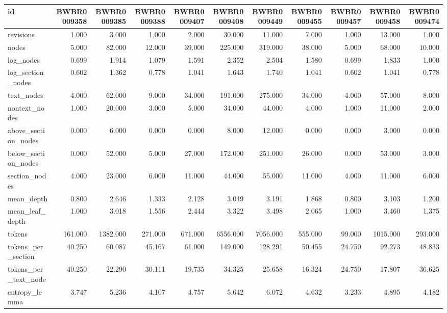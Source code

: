 \begin{tabular}{lrrrrrrrrrr}
\toprule
id & BWBR0009358 & BWBR0009385 & BWBR0009388 & BWBR0009407 & BWBR0009408 & BWBR0009449 & BWBR0009455 & BWBR0009457 & BWBR0009458 & BWBR0009474 \\
\midrule
revisions & 1.000 & 3.000 & 1.000 & 2.000 & 30.000 & 11.000 & 7.000 & 1.000 & 13.000 & 1.000 \\
\cline{1-11}
nodes & 5.000 & 82.000 & 12.000 & 39.000 & 225.000 & 319.000 & 38.000 & 5.000 & 68.000 & 10.000 \\
\cline{1-11}
log\_nodes & 0.699 & 1.914 & 1.079 & 1.591 & 2.352 & 2.504 & 1.580 & 0.699 & 1.833 & 1.000 \\
\cline{1-11}
log\_section\_nodes & 0.602 & 1.362 & 0.778 & 1.041 & 1.643 & 1.740 & 1.041 & 0.602 & 1.041 & 0.778 \\
\cline{1-11}
text\_nodes & 4.000 & 62.000 & 9.000 & 34.000 & 191.000 & 275.000 & 34.000 & 4.000 & 57.000 & 8.000 \\
\cline{1-11}
nontext\_nodes & 1.000 & 20.000 & 3.000 & 5.000 & 34.000 & 44.000 & 4.000 & 1.000 & 11.000 & 2.000 \\
\cline{1-11}
above\_section\_nodes & 0.000 & 6.000 & 0.000 & 0.000 & 8.000 & 12.000 & 0.000 & 0.000 & 3.000 & 0.000 \\
\cline{1-11}
below\_section\_nodes & 0.000 & 52.000 & 5.000 & 27.000 & 172.000 & 251.000 & 26.000 & 0.000 & 53.000 & 3.000 \\
\cline{1-11}
section\_nodes & 4.000 & 23.000 & 6.000 & 11.000 & 44.000 & 55.000 & 11.000 & 4.000 & 11.000 & 6.000 \\
\cline{1-11}
mean\_depth & 0.800 & 2.646 & 1.333 & 2.128 & 3.049 & 3.191 & 1.868 & 0.800 & 3.103 & 1.200 \\
\cline{1-11}
mean\_leaf\_depth & 1.000 & 3.018 & 1.556 & 2.444 & 3.322 & 3.498 & 2.065 & 1.000 & 3.460 & 1.375 \\
\cline{1-11}
tokens & 161.000 & 1382.000 & 271.000 & 671.000 & 6556.000 & 7056.000 & 555.000 & 99.000 & 1015.000 & 293.000 \\
\cline{1-11}
tokens\_per\_section & 40.250 & 60.087 & 45.167 & 61.000 & 149.000 & 128.291 & 50.455 & 24.750 & 92.273 & 48.833 \\
\cline{1-11}
tokens\_per\_text\_node & 40.250 & 22.290 & 30.111 & 19.735 & 34.325 & 25.658 & 16.324 & 24.750 & 17.807 & 36.625 \\
\cline{1-11}
entropy\_lemma & 3.747 & 5.236 & 4.107 & 4.757 & 5.642 & 6.072 & 4.632 & 3.233 & 4.895 & 4.182 \\

\end{tabular}
